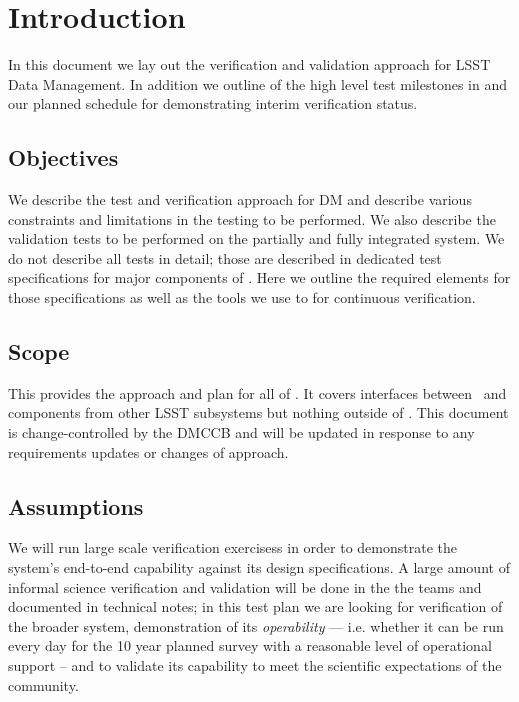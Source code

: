 
\section{Introduction \label{sect:intro}}
In this document  we lay out  the verification and validation approach for LSST Data Management. In addition we outline of the high level test milestones in  and our planned schedule for demonstrating interim verification status.

\subsection{Objectives \label{sect:objectives}}

We describe the test and verification approach for DM and describe various constraints and limitations in the testing to be performed.
We also describe the validation tests to be performed on the partially and fully integrated system.
We do not describe all tests in detail; those are described in dedicated test specifications for major components of \product. Here we outline the required elements for those specifications as well as the tools we use to for continuous verification.

\subsection{Scope \label{sect:scope}}

This provides the approach and plan for all of \product. It covers interfaces between \product\ and components from other LSST subsystems but nothing outside of \product.
This document is change-controlled by the DMCCB and will be updated in response to any requirements updates or changes of approach.

\subsection{Assumptions}

We will run large scale verification exercisess in order to demonstrate the system's end-to-end capability against its design specifications.
A large amount of informal science verification and validation will be done in the the teams and documented in technical notes; in this test plan we are looking for verification of the broader system, demonstration of its \emph{operability} --- i.e. whether it can be run every day for the 10 year planned survey with a reasonable level of operational support --  and to validate its capability to meet the scientific expectations of the community.

